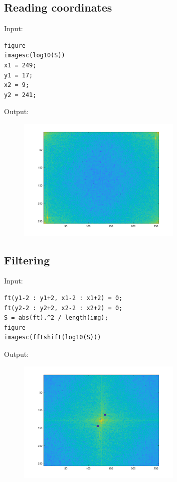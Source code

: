 \documentclass[12pt, a4paper]{article}
\begin{document}
\subsection{Reading coordinates}
Input:
\begin{verbatim}
figure
imagesc(log10(S))
x1 = 249;
y1 = 17;
x2 = 9;
y2 = 241;
\end{verbatim}
Output:
\\[-12mm]
\begin{figure}[H]
    \centering
    \includegraphics[width=0.7\textwidth]{fig23.png}
\end{figure}

\subsection{Filtering}
Input:
\begin{verbatim}
ft(y1-2 : y1+2, x1-2 : x1+2) = 0;
ft(y2-2 : y2+2, x2-2 : x2+2) = 0;
S = abs(ft).^2 / length(img);
figure
imagesc(fftshift(log10(S)))
\end{verbatim}
Output:
\begin{figure}[H]
    \centering
    \includegraphics[width=0.7\textwidth]{fig24.png}
\end{figure}
\end{document}
